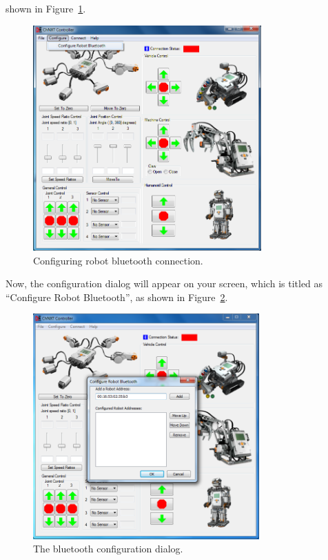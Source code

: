\documentclass[11pt]{article}
\begin{document}
shown in Figure~\ref{fig:menu_config}.
\begin{figure}[H]
  \begin{center}
    \includegraphics[height=3.4in]{figure/configuration/menuConfig.png}
    \caption{Configuring robot bluetooth connection.\label{fig:menu_config}}
  \end{center}
\end{figure}
Now, the configuration dialog will appear on your screen, which is titled as 
``Configure Robot Bluetooth'', as shown in Figure~\ref{fig:config_dialog}.
\begin{figure}[H]
  \begin{center}
    \includegraphics[height=3.4in]{figure/configuration/configDlg.png}
    \caption{The bluetooth configuration dialog.\label{fig:config_dialog}}
  \end{center}
\end{figure}
\end{document}
